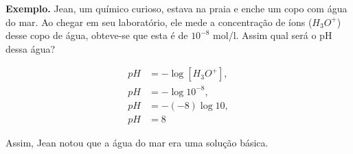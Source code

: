 \textbf{Exemplo.} Jean, um químico curioso, estava na praia e enche um copo com água do mar. Ao chegar em seu laboratório, ele mede a concentração de íons ($H_3O^{+}$) desse copo de água, obteve-se que esta é de $10^{-8}$ mol/l. Assim qual será o pH dessa água? 

\begin{align*}
pH &= -\log[H_3O^+], \\
pH &= -\log 10^{-8}, \\
pH &= -(-8) \log 10, \\
pH &= 8
\end{align*}

Assim, Jean notou que a água do mar era uma solução básica.


